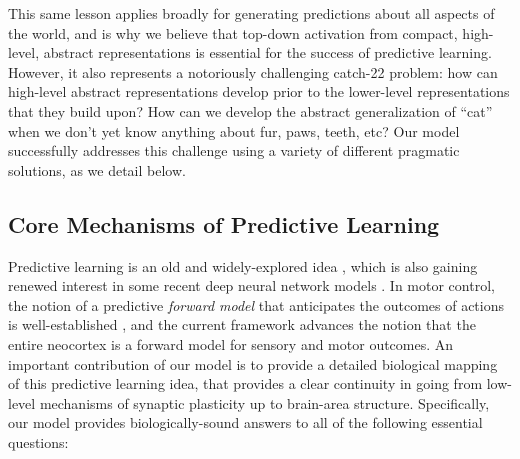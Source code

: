 \documentclass[11pt,twoside]{article}
\newif\myifpdf
\begin{document}
This same lesson applies broadly for generating predictions about all aspects of the world, and is why we believe that top-down activation from compact, high-level, abstract representations is essential for the success of predictive learning.  However, it also represents a notoriously challenging catch-22 problem: how can high-level abstract representations develop prior to the lower-level representations that they build upon?  How can we develop the abstract generalization of ``cat'' when we don't yet know anything about fur, paws, teeth, etc?  Our model successfully addresses this challenge using a variety of different pragmatic solutions, as we detail below.

\subsection{Core Mechanisms of Predictive Learning}

Predictive learning is an old and widely-explored idea \cite{Elman90,Elman91,Jordan89,SchusterPaliwal97,HawkinsBlakeslee04,GeorgeHawkins09}, which is also gaining renewed interest in some recent deep neural network models \cite{LotterKreimanCox16}.  In motor control, the notion of a predictive {\em forward model} that anticipates the outcomes of actions is well-established \cite{KawatoFurukawaSuzuki87,JordanRumelhart92,MiallWolpert96}, and the current framework advances the notion that the entire neocortex is a forward model for sensory and motor outcomes.  An important contribution of our model is to provide a detailed biological mapping of this predictive learning idea, that provides a clear continuity in going from low-level mechanisms of synaptic plasticity up to brain-area structure.  Specifically, our model provides biologically-sound answers to all of the following essential questions:
\end{document}
